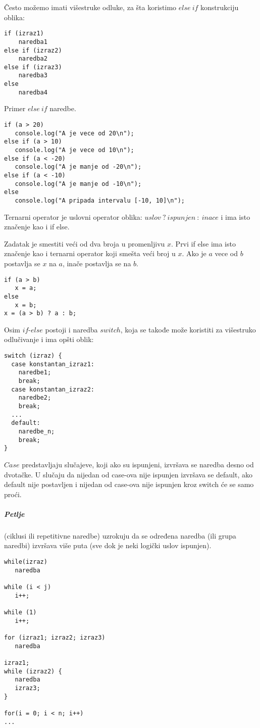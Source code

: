 Često možemo imati višestruke odluke, za šta koristimo $else\ if$ konstrukciju oblika:
\begin{lstlisting}[backgroundcolor = \color{lightgray}, breaklines=true]
if (izraz1)
    naredba1
else if (izraz2)
    naredba2
else if (izraz3)
    naredba3
else
    naredba4
\end{lstlisting}

\begin{primer}
Primer $else\ if$ naredbe.
\begin{lstlisting}[backgroundcolor = \color{lightgray}, breaklines=true]
if (a > 20)
   console.log("A je vece od 20\n");
else if (a > 10)
   console.log("A je vece od 10\n");
else if (a < -20)
   console.log("A je manje od -20\n");
else if (a < -10)
   console.log("A je manje od -10\n");
else
   console.log("A pripada intervalu [-10, 10]\n");
\end{lstlisting}
\end{primer}

Ternarni operator je uslovni operator oblika: $uslov\ ?\ ispunjen\ :\ inace$ i ima isto značenje kao i if else. 
\begin{primer} Zadatak je smestiti veći od dva broja u promenljivu $x$. Prvi if else ima isto značenje kao i ternarni operator koji smešta veći broj u $x$. Ako je $a$ vece od $b$ postavlja se $x$ na $a$, inače postavlja se na $b$.
\begin{lstlisting}[backgroundcolor = \color{lightgray}, breaklines=true]
if (a > b)
   x = a;
else
   x = b;
x = (a > b) ? a : b;
\end{lstlisting}
\end{primer}
Osim $if$-$else$ postoji i naredba $switch$, koja se takođe može koristiti za višestruko odlučivanje i ima opšti oblik:
\begin{lstlisting}[backgroundcolor = \color{lightgray}, breaklines=true]
switch (izraz) {
  case konstantan_izraz1: 
  	naredbe1;
  	break;
  case konstantan_izraz2: 
  	naredbe2;
  	break;
  ...
  default: 
    naredbe_n;
    break;
}
\end{lstlisting}
$Case$ predstavljaju slučajeve, koji ako su ispunjeni, izvršava se naredba desno od dvotačke. U slučaju da nijedan od case-ova nije ispunjen izvršava se default, ako default nije postavljen i nijedan od case-ova nije ispunjen kroz switch će se samo proći.

\subparagraph{Petlje}(ciklusi ili repetitivne naredbe) uzrokuju da se određena
naredba (ili grupa naredbi) izvršava više puta (sve dok je neki logički uslov ispunjen).
\begin{lstlisting}[backgroundcolor = \color{lightgray}, breaklines=true]
while(izraz)
   naredba
   
while (i < j)
   i++;
   
while (1)
   i++;
   
for (izraz1; izraz2; izraz3)
   naredba

izraz1;
while (izraz2) {
   naredba
   izraz3;
}

for(i = 0; i < n; i++)
...
\end{lstlisting}

